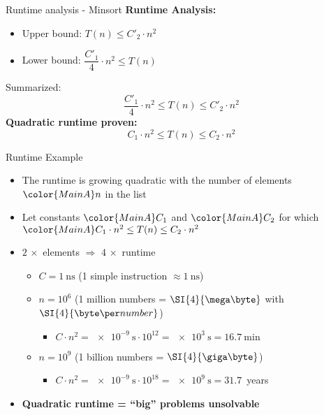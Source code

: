 \begin{frame}{Runtime analysis - Minsort}
  \textbf{Runtime Analysis:}
  \begin{itemize}
    \item
      {\color{MainB}Upper bound}:
      \hspace{1.5em} $T(n) \leq C'_2 \cdot n^2$
    \item
      {\color{MainB}Lower bound}:
      \hspace{1.5em} $\dfrac{C'_1}{4} \cdot n^2 \leq T(n)$
  \end{itemize}
  \begin{block}{Summarized:}
    \begin{displaymath}
      \frac{C'_1}{4} \cdot n^2 \leq T(n) \leq C'_2 \cdot n^2
    \end{displaymath}
    \textbf{Quadratic runtime proven:}
    \begin{displaymath}
      C_1 \cdot n^2 \leq T(n) \leq C_2 \cdot n^2
    \end{displaymath}
  \end{block}
\end{frame}


\begin{frame}{Runtime Example}
  \begin{itemize}
    \item
      The runtime is growing quadratic with the number of elements
      ${\color{MainA}n}$ in the list
    \item
      Let constants $\color{MainA}C_1$ and $\color{MainA}C_2$
      for which $\color{MainA}C_1 \cdot n^2 \leq T(n) \leq C_2 \cdot n^2$
    \item
      $2\, \times$ elements $\Rightarrow$ $4\, \times$ runtime
      \begin{itemize}
        \item
          $C = \SI{1}{\nano\second}$
          (1 simple instruction $\approx \SI{1}{\nano\second}$)
        \item
          $n = 10^6$ (1 million numbers = $\SI{4}{\mega\byte}$
          with $\SI{4}{\byte\per number}$)
          \begin{itemize}
            \item
              $C \cdot n^2 = \SI{e-9}{\second} \cdot 10^{12}
              = \SI{e3}{\second} = \SI{16.7}{\minute}$
          \end{itemize}
        \item
          $n = 10^9$ (1 billion numbers = $\SI{4}{\giga\byte}$)
          \begin{itemize}
            \item
              $C \cdot n^2 = \SI{e-9}{\second} \cdot 10^{18}
              = \SI{e9}{\second} = 31.7$~years
          \end{itemize}
      \end{itemize}
    \item
      \textbf{Quadratic runtime = \enquote{big} problems unsolvable}
  \end{itemize}
\end{frame}